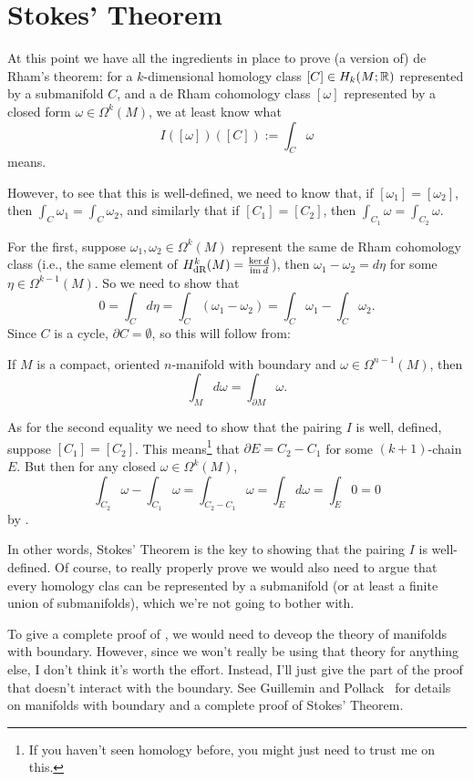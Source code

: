 \section{Stokes' Theorem} 
\label{sec:stokes_theorem}

At this point we have all the ingredients in place to prove (a version of) de Rham's theorem: for a $k$-dimensional homology class $[C] \in H_k(M;\mathbb{R})$ represented by a submanifold $C$, and a de Rham cohomology class $[\omega]$ represented by a closed form $\omega \in \Omega^k(M)$, we at least know what
\[
	I([\omega])([C]) := \int_C\omega
\]
means.

However, to see that this is well-defined, we need to know that, if $[\omega_1] = [\omega_2]$, then $\int_C \omega_1 = \int_C \omega_2$, and similarly that if $[C_1] = [C_2]$, then $\int_{C_1}\omega = \int_{C_2}\omega$.

For the first, suppose $\omega_1, \omega_2 \in \Omega^k(M)$ represent the same de Rham cohomology class (i.e., the same element of $H_{\text{dR}}^k(M) = \frac{\ker d}{\operatorname{im} d}$), then $\omega_1 - \omega_2 = d\eta$ for some $\eta \in \Omega^{k-1}(M)$. So we need to show that
\[
	0 = \int_C d\eta = \int_C(\omega_1 - \omega_2) = \int_C \omega_1 - \int_C \omega_2.
\]
Since $C$ is a cycle, $\partial C = \emptyset$, so this will follow from:

\begin{theorem}\label{thm:stokes}
	If $M$ is a compact, oriented $n$-manifold with boundary and $\omega \in \Omega^{n-1}(M)$, then
	\[
		\int_M d\omega = \int_{\partial M} \omega.
	\]
\end{theorem}

As for the second equality we need to show that the pairing $I$ is well, defined, suppose $[C_1] = [C_2]$. This means\footnote{If you haven't seen homology before, you might just need to trust me on this.} that $\partial E = C_2 - C_1$ for some $(k+1)$-chain $E$. But then for any closed $\omega \in \Omega^k(M)$,
\[
	\int_{C_2} \omega - \int_{C_1}\omega = \int_{C_2-C_1} \omega = \int_E d \omega = \int_E 0 = 0
\]
by . 

In other words, Stokes' Theorem is the key to showing that the pairing $I$ is well-defined. Of course, to really properly prove  we would also need to argue that every homology clas can be represented by a submanifold (or at least a finite union of submanifolds), which we're not going to bother with.

To give a complete proof of , we would need to deveop the theory of manifolds with boundary. However, since we won't really be using that theory for anything else, I don't think it's worth the effort. Instead, I'll just give the part of the proof that doesn't interact with the boundary. See Guillemin and Pollack~\cite{guilleminDifferentialTopology2010} for details on manifolds with boundary and a complete proof of Stokes' Theorem.

